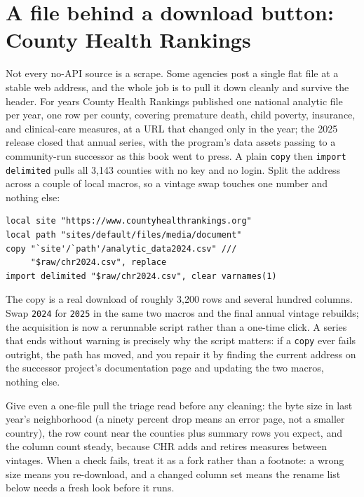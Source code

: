 \documentclass[
    a4paper,
    fontsize=10pt,
    twoside=true,
    numbers=noenddot,
]{kaobook}
\begin{document}
\section{A file behind a download button: County Health Rankings}\label{sec:chr}
Not every no-API source is a scrape. Some agencies post a single flat file at a stable web address, and the whole job is to pull it down cleanly and survive the header. For years County Health Rankings published one national analytic file per year, one row per county, covering premature death, child poverty, insurance, and clinical-care measures, at a URL that changed only in the year; the 2025 release closed that annual series, with the program's data assets passing to a community-run successor as this book went to press. A plain \texttt{copy} then \texttt{import delimited} pulls all 3{,}143 counties with no key and no login. Split the address across a couple of local macros, so a vintage swap touches one number and nothing else:
\par
{\footnotesize
\begin{verbatim}
local site "https://www.countyhealthrankings.org"
local path "sites/default/files/media/document"
copy "`site'/`path'/analytic_data2024.csv" ///
     "$raw/chr2024.csv", replace
import delimited "$raw/chr2024.csv", clear varnames(1)
\end{verbatim}
}
The copy is a real download of roughly 3{,}200 rows and several hundred columns. Swap \texttt{2024} for \texttt{2025} in the same two macros and the final annual vintage rebuilds; the acquisition is now a rerunnable script rather than a one-time click. A series that ends without warning is precisely why the script matters: if a \texttt{copy} ever fails outright, the path has moved, and you repair it by finding the current address on the successor project's documentation page and updating the two macros, nothing else.

Give even a one-file pull the triage read before any cleaning: the byte size in last year's neighborhood (a ninety percent drop means an error page, not a smaller country), the row count near the counties plus summary rows you expect, and the column count steady, because CHR adds and retires measures between vintages. When a check fails, treat it as a fork rather than a footnote: a wrong size means you re-download, and a changed column set means the rename list below needs a fresh look before it runs.
\end{document}
